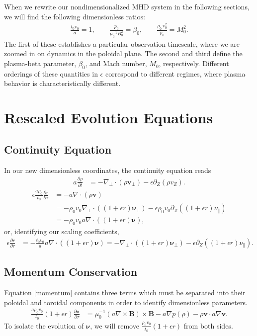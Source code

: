 \documentclass{article}
\newcommand{\para}{\parallel}
\newcommand{\ep}{\epsilon}
\newcommand{\np}{\nabla_\perp}
\newcommand{\p}{\partial}
\newcommand{\deriv}[2]{\frac{\p #1}{\p #2}}
\newcommand{\pth} [1] {\left( #1 \right) }
\begin{document}
When we rewrite our nondimensionalized MHD system in the following sections, we will find the following dimensionless ratios:  
\begin{align*}
    \frac{t_0 v_0}{a} = 1, \qquad 
    \frac{p_0}{\mu_0^{-1}B_0^2} = \beta_0, \qquad 
    \frac{\rho_0\,v_0^2}{p_0} = M_0^2. 
\end{align*}
The first of these establishes a particular observation timescale, where we are zoomed in on dynamics in the poloidal plane. The second and third define the plasma-beta parameter, $\beta_0$, and Mach number, $M_0$, respectively. Different orderings of these quantities in $\ep$ correspond to different regimes, where plasma behavior is characteristically different. 


\section{Rescaled Evolution Equations}
\subsection{Continuity Equation}
In our new dimensionless coordinates, the continuity equation reads
\begin{align*}
    a\deriv{\rho}{t} &= -\np\cdot\pth{\rho\bm{v}_\perp} - \ep\p_Z\pth{\rho v_Z}. 
\end{align*}
\begin{align*}
    \ep\frac{a\rho_0}{t_0}\deriv{r}{\tau} &= -a\nabla\cdot\pth{\rho\bm{v}} \\ 
    &= -\rho_0v_0\np\cdot\pth{\pth{1+\ep r}\bm{\nu}_\perp} - \ep\rho_0v_0 \p_Z\pth{\pth{1+\ep r}\nu_\para} \\ 
    &= -\rho_0v_0 a\nabla\cdot\pth{\pth{1+\ep r} \bm{\nu}}, 
\end{align*}
or, identifying our scaling coefficients, 
\begin{align*} 
    \ep\deriv{r}{\tau} &= -\frac{t_0v_0}{a} a\nabla\cdot\pth{\pth{1+\ep r}\bm{\nu}}
    = -\np\cdot\pth{\pth{1+\ep r}\bm{\nu}_\perp} - \ep\p_Z\pth{\pth{1+\ep r}\nu_\para}. 
\end{align*}

\subsection{Momentum Conservation}
Equation \eqref{momentum} contains three terms which must be separated into their poloidal and toroidal components in order to identify dimensionless parameters.
\begin{align*}
    \frac{a\rho_0v_0}{t_0} \pth{1+\ep r} \deriv{\bm{\nu}}{\tau} &= \mu_0^{-1} \pth{a\nabla\times \bm{B}} \times \bm{B} - a\nabla p(\rho) - \rho \bm{v}\cdot a\nabla \bm{v}. 
\end{align*}
To isolate the evolution of $\bm{\nu}$, we will remove $\frac{\rho_0v_0}{t_0} \pth{1+\ep r}$ from both sides. 
\end{document}
